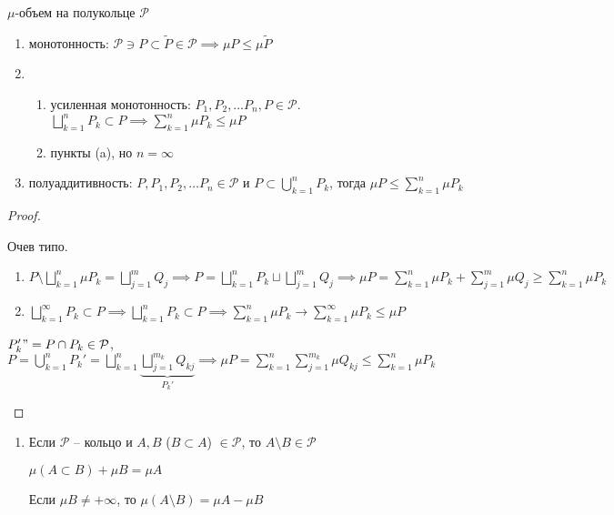 \begin{theorem}
    $\mu$-объем на полукольце $\mathcal{P}$

    \begin{enumerate}
        \item монотонность: $\mathcal{P} \ni P \subset \tilde{P} \in \mathcal{P} \implies \mu P \leq \mu \tilde{P}$
        \item {
            \begin{enumerate}
                \item усиленная монотонность: $P_1, P_2, \dots P_n, P \in \mathcal{P}$. $\bigsqcup_{k=1}^n P_k \subset P \implies \sum_{k=1}^n \mu P_k \leq \mu P$
                \item пункты (a), но $n = \infty$
            \end{enumerate}
        }
        \item полуаддитивность: $P, P_1, P_2, \dots P_n \in \mathcal{P}$ и $P \subset \bigcup_{k=1}^{n}P_k$, тогда $\mu P \leq \sum_{k=1}^{n} \mu P_k$ 
    \end{enumerate}
\end{theorem}

\begin{proof}
    \begin{enumerate}
        \item Очев типо.
        \item {
        \begin{enumerate}
            \item $P \setminus \bigsqcup_{k=1}^{n} \mu P_k =  \bigsqcup_{j=1}^{m} Q_j \implies P = \bigsqcup_{k=1}^{n} P_k \sqcup \bigsqcup_{j=1}^m Q_j \implies \mu P = \sum_{k=1}^{n} \mu P_k + \sum_{j=1}^{m} \mu Q_j \geq \sum_{k=1}^{n} \mu P_k $
            \item $\bigsqcup_{k=1}^{\infty} P_k \subset P \implies \bigsqcup_{k=1}^n P_k \subset P \implies \sum_{k=1}^{n} \mu P_k \rightarrow \sum_{k=1}^{\infty} \mu P_k \leq \mu P$
        \end{enumerate}
        \item $P_k' "= P \cap P_k \in \mathcal{P}$, \;\; $P = \bigcup_{k=1}^{n} P_k' = \bigsqcup_{k=1}^{n} \underbrace{\bigsqcup_{j=1}^{m_k} Q_{kj}}_{P_k'} \implies \mu P = \sum_{k=1}^n \sum_{j=1}^{m_k} \mu Q_{kj} \leq \sum_{k=1}^n \mu P_k$
        }
    \end{enumerate}
\end{proof}

\begin{remark}
    \begin{enumerate}
        \item {
            Если $\mathcal{P}$ -- кольцо и $A, B$ ($B \subset A$) $ \in \mathcal{P}$, то $A \setminus B \in \mathcal{P}$

            $\mu (A \subset B) + \mu B = \mu A$

            Если $\mu B \neq +\infty$, то $\mu (A \setminus B) = \mu A - \mu B$
        }
    \end{enumerate}
\end{remark}

